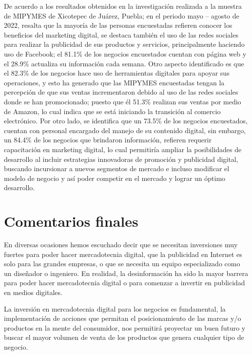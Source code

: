 \documentclass[12pt]{difu100cia} %
\begin{document}
De acuerdo a los resultados obtenidos en la investigación realizada a la muestra de MIPYMES de Xicotepec de Juárez, Puebla; en el periodo mayo – agosto de 2022, resalta que la mayoría de las personas encuestadas refieren conocer los beneficios del marketing digital, se destaca también el uso de las redes sociales para realizar la publicidad de sus productos y servicios, principalmente haciendo uso de Facebook; el 81.1\% de los negocios encuestados cuentan con página web y el 28.9\% actualiza su información cada semana. Otro aspecto identificado es que el 82.3\% de los negocios hace uso de herramientas digitales para apoyar sus operaciones, y esto ha generado que las MIPYMES encuestadas tengan la percepción de que sus ventas incrementaron debido al uso de las redes sociales donde se han promocionado; puesto que él 51.3\% realizan sus ventas por medio de Amazon, lo cual indica que se está iniciando la transición al comercio electrónico. Por otro lado, se identifica que un 73.5\% de los negocios encuestados, cuentan con personal encargado del manejo de su contenido digital, sin embargo, un 84.4\% de los negocios que brindaron información, refieren requerir capacitación en marketing digital, lo cual permitiría ampliar la posibilidades de desarrollo al incluir estrategias innovadoras de promoción y publicidad digital, buscando incursionar a nuevos segmentos de mercado e incluso modificar el modelo de negocio y así poder competir en el mercado y lograr un óptimo desarrollo.

\section{Comentarios finales}
\label{Comentarios finales}

En diversas ocasiones hemos escuchado decir que se necesitan inversiones muy fuertes para poder hacer mercadotecnia digital, que la publicidad en Internet es solo para las grandes empresas, o que se necesita un equipo especializado como un diseñador o ingeniero. En realidad, la desinformación ha sido la mayor barrera para poder hacer mercadotecnia digital o para comenzar a invertir en publicidad en medios digitales.

La inversión en mercadotecnia digital para los negocios es fundamental, la implementación de acciones que permitan el posicionamiento de las marcas y/o productos en la mente del consumidor, nos permitirá proyectar un buen futuro y buscar el mayor volumen de venta de los productos que genera cualquier tipo de negocio.
\end{document}
